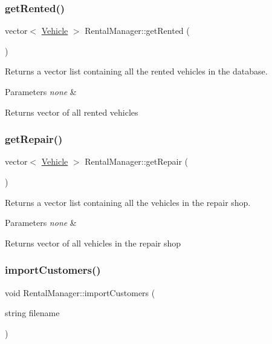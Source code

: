 \subsubsection{\texorpdfstring{get\+Rented()}{getRented()}}
{\footnotesize\ttfamily vector$<$ \hyperlink{class_vehicle}{Vehicle} $>$ Rental\+Manager\+::get\+Rented (\begin{DoxyParamCaption}{ }\end{DoxyParamCaption})}

Returns a vector list containing all the rented vehicles in the database.


\begin{DoxyParams}{Parameters}
{\em none} & \\
\hline
\end{DoxyParams}
\begin{DoxyReturn}{Returns}
vector of all rented vehicles 
\end{DoxyReturn}
\mbox{\label{class_rental_manager_a7aeec650157e516c093df63fdb49c971}} 
\subsubsection{\texorpdfstring{get\+Repair()}{getRepair()}}
{\footnotesize\ttfamily vector$<$ \hyperlink{class_vehicle}{Vehicle} $>$ Rental\+Manager\+::get\+Repair (\begin{DoxyParamCaption}{ }\end{DoxyParamCaption})}

Returns a vector list containing all the vehicles in the repair shop.


\begin{DoxyParams}{Parameters}
{\em none} & \\
\hline
\end{DoxyParams}
\begin{DoxyReturn}{Returns}
vector of all vehicles in the repair shop 
\end{DoxyReturn}
\mbox{\label{class_rental_manager_a1a1f994736ce9ccb3d3ceef5cfdd255e}} 
\subsubsection{\texorpdfstring{import\+Customers()}{importCustomers()}}
{\footnotesize\ttfamily void Rental\+Manager\+::import\+Customers (\begin{DoxyParamCaption}\item[{string}]{filename }\end{DoxyParamCaption})}

